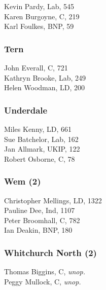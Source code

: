\documentclass[a4paper,openany,10pt]{book}
\begin{document}


Kevin Pardy, Lab, 545\\
Karen Burgoyne, C, 219\\
Karl Foulkes, BNP, 59\\


\subsubsection*{Tern}



John Everall, C, 721\\
Kathryn Brooke, Lab, 249\\
Helen Woodman, LD, 200\\


\subsubsection*{Underdale}



Miles Kenny, LD, 661\\
Sue Batchelor, Lab, 162\\
Jan Allmark, UKIP, 122\\
Robert Osborne, C, 78\\


\subsubsection*{Wem (2)}



Christopher Mellings, LD, 1322\\
Pauline Dee, Ind, 1107\\
Peter Broomhall, C, 782\\
Ian Deakin, BNP, 180\\


\subsubsection*{Whitchurch North (2)}



Thomas Biggins, C, \emph{unop.}\\
Peggy Mullock, C, \emph{unop.}\\
\end{document}
